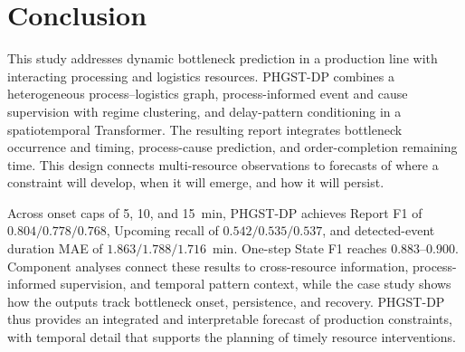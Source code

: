 \documentclass[a4paper,fleqn]{cas-dc}
\begin{document}
\section{Conclusion}\label{sec:conclusion}

This study addresses dynamic bottleneck prediction in a production line with interacting processing and logistics resources. PHGST-DP combines a heterogeneous process--logistics graph, process-informed event and cause supervision with regime clustering, and delay-pattern conditioning in a spatiotemporal Transformer. The resulting report integrates bottleneck occurrence and timing, process-cause prediction, and order-completion remaining time. This design connects multi-resource observations to forecasts of where a constraint will develop, when it will emerge, and how it will persist.


Across onset caps of 5, 10, and 15~min, PHGST-DP achieves Report F1 of $0.804/0.778/0.768$, Upcoming recall of $0.542/0.535/0.537$, and detected-event duration MAE of $1.863/1.788/1.716$~min. One-step State F1 reaches $0.883$--$0.900$. Component analyses connect these results to cross-resource information, process-informed supervision, and temporal pattern context, while the case study shows how the outputs track bottleneck onset, persistence, and recovery. PHGST-DP thus provides an integrated and interpretable forecast of production constraints, with temporal detail that supports the planning of timely resource interventions.





\end{document}
